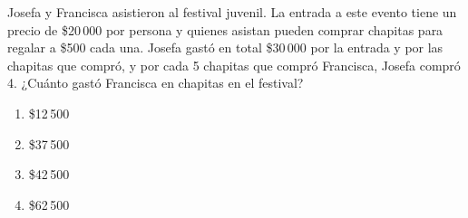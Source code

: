 \begin{problem}
    Josefa y Francisca asistieron al festival juvenil. La entrada a este evento tiene un precio de \$20\,000 por persona y quienes asistan pueden comprar chapitas para regalar a \$500 cada una. Josefa gastó en total \$30\,000 por la entrada y por las chapitas que compró, y por cada 5 chapitas que compró Francisca, Josefa compró 4. ¿Cuánto gastó Francisca en chapitas en el festival?

    \begin{enumerate}[label=\Alph*.]
        \item \$12\,500
        \item \$37\,500
        \item \$42\,500
        \item \$62\,500
    \end{enumerate}
\end{problem}
